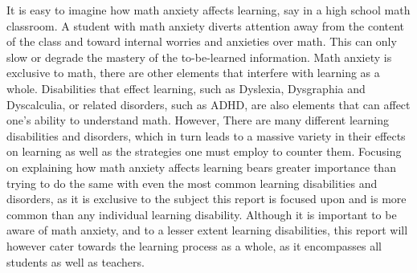 \newline\newline
It is easy to imagine how math anxiety affects learning, say in a high school math classroom. A student with math anxiety diverts attention away from the content of the class and toward internal worries and anxieties over math. This can only slow or degrade the mastery of the to-be-learned information. 
\newline\newline
Math anxiety is exclusive to math, there are other elements that interfere with learning as a whole. Disabilities that effect learning, such as Dyslexia, Dysgraphia and Dyscalculia, or related disorders, such as ADHD, are also elements that can affect one's ability to understand math\cite{TypesDisabilities}. However, There are many different learning disabilities and disorders, which in turn leads to a massive variety in their effects on learning as well as the strategies one must employ to counter them. Focusing on explaining how math anxiety affects learning bears greater importance than trying to do the same with even the most common learning disabilities and disorders, as it is exclusive to the subject this report is focused upon and is more common than any individual learning disability. 
\newline \newline
Although it is important to be aware of math anxiety, and to a lesser extent learning disabilities, this report will however cater towards the learning process as a whole, as it encompasses all students as well as teachers. 